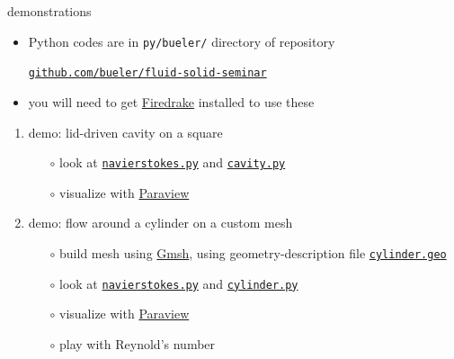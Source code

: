 \documentclass[10pt,hyperref,colorlinks]{beamer}
\begin{document}
\begin{frame}{demonstrations}

\begin{itemize}
\item Python codes are in \texttt{py/bueler/} directory of repository

\begin{center}
 \href{https://github.com/bueler/fluid-solid-seminar}{\texttt{github.com/bueler/fluid-solid-seminar}}
\end{center}
\item you will need to get \href{https://www.firedrakeproject.org/}{Firedrake} installed to use these
\end{itemize}

\bigskip
\begin{enumerate}
\item demo: lid-driven cavity on a square
    \begin{itemize}
    \item[$\circ$] look at \href{https://github.com/bueler/fluid-solid-seminar/blob/main/py/bueler/navierstokes.py}{\texttt{navierstokes.py}} and \href{https://github.com/bueler/fluid-solid-seminar/blob/main/py/bueler/cavity.py}{\texttt{cavity.py}}
    \item[$\circ$] visualize with \href{https://www.paraview.org/}{Paraview}
    \end{itemize}

\bigskip
\item demo: flow around a cylinder on a custom mesh
    \begin{itemize}
    \item[$\circ$] build mesh using \href{http://gmsh.info/}{Gmsh}, using geometry-description file \href{https://github.com/bueler/fluid-solid-seminar/blob/main/py/bueler/cylinder.geo}{\texttt{cylinder.geo}}
    \item[$\circ$] look at \href{https://github.com/bueler/fluid-solid-seminar/blob/main/py/bueler/navierstokes.py}{\texttt{navierstokes.py}} and \href{https://github.com/bueler/fluid-solid-seminar/blob/main/py/bueler/cylinder.py}{\texttt{cylinder.py}}
    \item[$\circ$] visualize with \href{https://www.paraview.org/}{Paraview}
    \item[$\circ$] play with Reynold's number
    \end{itemize}
\end{enumerate}
\end{frame}
\end{document}
